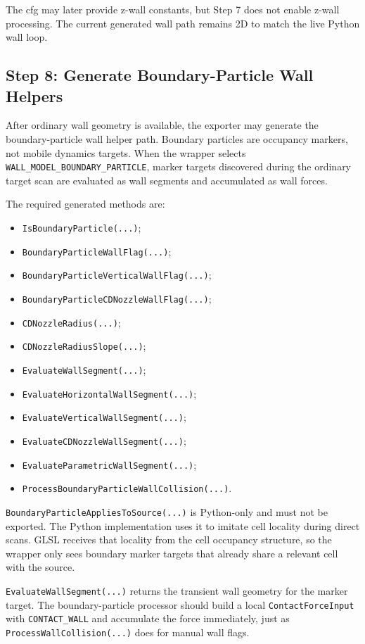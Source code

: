The cfg may later provide z-wall constants, but Step 7 does not enable z-wall
processing.  The current generated wall path remains 2D to match the live
Python wall loop.

\subsection{Step 8: Generate Boundary-Particle Wall Helpers}

After ordinary wall geometry is available, the exporter may generate the
boundary-particle wall helper path.  Boundary particles are occupancy markers,
not mobile dynamics targets.  When the wrapper selects
\texttt{WALL\_MODEL\_BOUNDARY\_PARTICLE}, marker targets discovered during the
ordinary target scan are evaluated as wall segments and accumulated as wall
forces.

The required generated methods are:
\begin{itemize}
    \item \texttt{IsBoundaryParticle(...)};
    \item \texttt{BoundaryParticleWallFlag(...)};
    \item \texttt{BoundaryParticleVerticalWallFlag(...)};
    \item \texttt{BoundaryParticleCDNozzleWallFlag(...)};
    \item \texttt{CDNozzleRadius(...)};
    \item \texttt{CDNozzleRadiusSlope(...)};
    \item \texttt{EvaluateWallSegment(...)};
    \item \texttt{EvaluateHorizontalWallSegment(...)};
    \item \texttt{EvaluateVerticalWallSegment(...)};
    \item \texttt{EvaluateCDNozzleWallSegment(...)};
    \item \texttt{EvaluateParametricWallSegment(...)};
    \item \texttt{ProcessBoundaryParticleWallCollision(...)}.
\end{itemize}

\texttt{BoundaryParticleAppliesToSource(...)} is Python-only and must not be
exported.  The Python implementation uses it to imitate cell locality during
direct scans.  GLSL receives that locality from the cell occupancy structure,
so the wrapper only sees boundary marker targets that already share a relevant
cell with the source.

\texttt{EvaluateWallSegment(...)} returns the transient wall geometry for the
marker target.  The boundary-particle processor should build a local
\texttt{ContactForceInput} with \texttt{CONTACT\_WALL} and accumulate the force
immediately, just as \texttt{ProcessWallCollision(...)} does for manual wall
flags.

